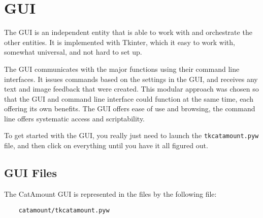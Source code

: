 \chapter{GUI}
\hypertarget{gui}{}

The GUI is an independent entity that is able to work with and
orchestrate the other entities. It is implemented with Tkinter, which
it easy to work with, somewhat universal, and not hard to set up.

The GUI communicates with the major functions using their command line
interfaces. It issues commands based on the settings in the GUI, and
receives any text and image feedback that were created. This modular
approach was chosen so that the GUI and command line interface could
function at the same time, each offering its own benefits. The GUI
offers ease of use and browsing, the command line offers systematic
access and scriptability.

To get started with the GUI, you really just need to launch the
\verb=tkcatamount.pyw= file, and then click on everything until you
have it all figured out.

\section{GUI Files}

The CatAmount GUI is represented in the files by the following file:

\begin{verbatim}
    catamount/tkcatamount.pyw
\end{verbatim}

